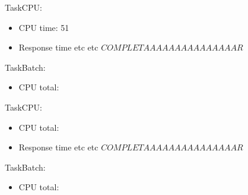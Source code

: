 
TaskCPU:
\begin{itemize}
 \item CPU time: 51
 \item Response time etc etc 			$ COMPLETAAAAAAAAAAAAAAAR  $    %
\end{itemize}

TaskBatch:
\begin{itemize}
 \item CPU total:
\end{itemize}


TaskCPU:
\begin{itemize}
 \item CPU total:
 \item Response time etc etc 			$ COMPLETAAAAAAAAAAAAAAAR  $    %
\end{itemize}

TaskBatch:
\begin{itemize}
 \item CPU total:
\end{itemize}


